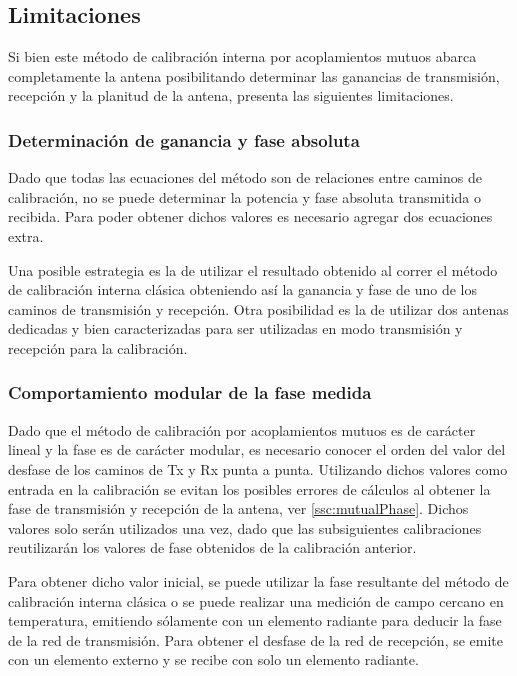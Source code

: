 \subsection{Limitaciones}

Si bien este método de calibración interna por acoplamientos mutuos abarca completamente la antena posibilitando determinar las
ganancias de transmisión, recepción y la planitud de la antena, presenta las siguientes limitaciones.


\subsubsection{Determinación de ganancia y fase absoluta}

Dado que todas las ecuaciones del método son de relaciones entre caminos de calibración, no se puede determinar la potencia y
fase absoluta transmitida o recibida. Para poder obtener dichos valores es necesario agregar dos ecuaciones extra.

Una posible estrategia es la de utilizar el resultado obtenido al correr el método de calibración interna clásica obteniendo
así la ganancia y fase de uno de los caminos de transmisión y recepción. Otra posibilidad es la de utilizar dos antenas
dedicadas y bien caracterizadas para ser utilizadas en modo transmisión y recepción para la calibración.


\subsubsection{Comportamiento modular de la fase medida}

Dado que el método de calibración por acoplamientos mutuos es de carácter lineal y la fase es de carácter modular, es necesario 
conocer el orden del valor del desfase de los caminos de Tx y Rx punta a punta. Utilizando dichos valores como entrada en la
calibración se evitan los posibles errores de cálculos al obtener la fase de transmisión y recepción de la antena, ver
\ref{ssc:mutualPhase}. Dichos valores solo serán utilizados una vez, dado que las subsiguientes calibraciones reutilizarán los
valores de fase obtenidos de la calibración anterior.

Para obtener dicho valor inicial, se puede utilizar la fase resultante del método de calibración interna clásica o se puede
realizar una medición de campo cercano en temperatura, emitiendo sólamente con un elemento radiante para deducir la fase de la
red de transmisión. Para obtener el desfase de la red de recepción, se emite con un elemento externo y se recibe con solo un
elemento radiante.


